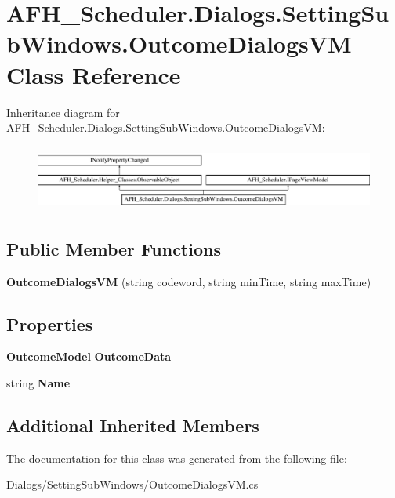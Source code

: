 \section{A\+F\+H\+\_\+\+Scheduler.\+Dialogs.\+Setting\+Sub\+Windows.\+Outcome\+Dialogs\+VM Class Reference}
\label{class_a_f_h___scheduler_1_1_dialogs_1_1_setting_sub_windows_1_1_outcome_dialogs_v_m}
Inheritance diagram for A\+F\+H\+\_\+\+Scheduler.\+Dialogs.\+Setting\+Sub\+Windows.\+Outcome\+Dialogs\+VM\+:\begin{figure}[H]
\begin{center}
\leavevmode
\includegraphics[height=2.170543cm]{class_a_f_h___scheduler_1_1_dialogs_1_1_setting_sub_windows_1_1_outcome_dialogs_v_m}
\end{center}
\end{figure}
\subsection*{Public Member Functions}
\begin{DoxyCompactItemize}
\item 
\mbox{\label{class_a_f_h___scheduler_1_1_dialogs_1_1_setting_sub_windows_1_1_outcome_dialogs_v_m_a4808294bbebf4af2957e82fbcfa974ad}} 
{\bfseries Outcome\+Dialogs\+VM} (string codeword, string min\+Time, string max\+Time)
\end{DoxyCompactItemize}
\subsection*{Properties}
\begin{DoxyCompactItemize}
\item 
\mbox{\label{class_a_f_h___scheduler_1_1_dialogs_1_1_setting_sub_windows_1_1_outcome_dialogs_v_m_a32e894f4edd9da60ed3d8f9d93669793}} 
\textbf{ Outcome\+Model} {\bfseries Outcome\+Data}\hspace{0.3cm}{\ttfamily  [get, set]}
\item 
\mbox{\label{class_a_f_h___scheduler_1_1_dialogs_1_1_setting_sub_windows_1_1_outcome_dialogs_v_m_a31207b9b083d390ce1b335cf18ae874d}} 
string {\bfseries Name}\hspace{0.3cm}{\ttfamily  [get]}
\end{DoxyCompactItemize}
\subsection*{Additional Inherited Members}


The documentation for this class was generated from the following file\+:\begin{DoxyCompactItemize}
\item 
Dialogs/\+Setting\+Sub\+Windows/Outcome\+Dialogs\+V\+M.\+cs\end{DoxyCompactItemize}
